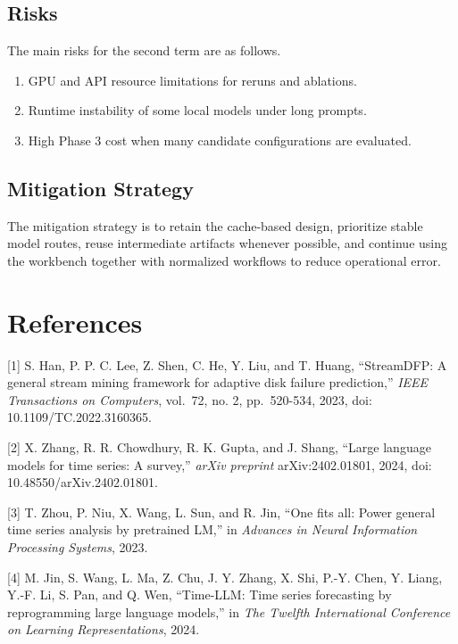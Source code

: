 \documentclass[
  11pt,
  a4paper]{article}
\providecommand{\tightlist}{%
  \setlength{\itemsep}{0pt}\setlength{\parskip}{0pt}}
\begin{document}
\hypertarget{risks}{%
\subsection{Risks}\label{risks}}

The main risks for the second term are as follows.

\begin{enumerate}
\def\labelenumi{\arabic{enumi}.}
\tightlist
\item
  GPU and API resource limitations for reruns and ablations.
\item
  Runtime instability of some local models under long prompts.
\item
  High Phase 3 cost when many candidate configurations are evaluated.
\end{enumerate}

\hypertarget{mitigation-strategy}{%
\subsection{Mitigation Strategy}\label{mitigation-strategy}}

The mitigation strategy is to retain the cache-based design, prioritize
stable model routes, reuse intermediate artifacts whenever possible, and
continue using the workbench together with normalized workflows to
reduce operational error.

\hypertarget{references}{%
\section{References}\label{references}}

{[}1{]} S. Han, P. P. C. Lee, Z. Shen, C. He, Y. Liu, and T. Huang,
``StreamDFP: A general stream mining framework for adaptive disk failure
prediction,'' \emph{IEEE Transactions on Computers}, vol.~72, no. 2,
pp.~520-534, 2023, doi: 10.1109/TC.2022.3160365.

{[}2{]} X. Zhang, R. R. Chowdhury, R. K. Gupta, and J. Shang, ``Large
language models for time series: A survey,'' \emph{arXiv preprint}
arXiv:2402.01801, 2024, doi: 10.48550/arXiv.2402.01801.

{[}3{]} T. Zhou, P. Niu, X. Wang, L. Sun, and R. Jin, ``One fits all:
Power general time series analysis by pretrained LM,'' in \emph{Advances
in Neural Information Processing Systems}, 2023.

{[}4{]} M. Jin, S. Wang, L. Ma, Z. Chu, J. Y. Zhang, X. Shi, P.-Y. Chen,
Y. Liang, Y.-F. Li, S. Pan, and Q. Wen, ``Time-LLM: Time series
forecasting by reprogramming large language models,'' in \emph{The
Twelfth International Conference on Learning Representations}, 2024.
\end{document}
